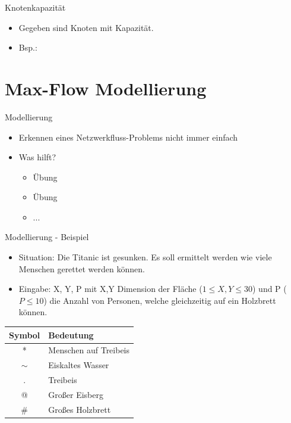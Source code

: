 \documentclass[18pt]{beamer}
\begin{document}
\begin{frame}{Knotenkapazit\"at}
\begin{itemize}
\item Gegeben sind Knoten mit Kapazit\"at.
\item Bsp.:
\end{itemize}
\begin{center}
\end{center}
\end{frame}

\section{Max-Flow Modellierung}
\begin{frame}{Modellierung}
\begin{itemize}
\item Erkennen eines Netzwerkfluss-Problems nicht immer einfach
\pause
\item Was hilft?
\begin{itemize}
\pause
\item \"Ubung
\item \"Ubung
\item ...
\end{itemize}
\end{itemize}
\end{frame}

\begin{frame}{Modellierung - Beispiel}
\begin{itemize}
\item Situation: Die Titanic ist gesunken. Es soll ermittelt werden wie viele Menschen gerettet werden k\"onnen.
\item Eingabe: X, Y, P mit X,Y Dimension der Fl\"ache (\(1 \leq X,Y \leq 30\)) und P (\(P \leq 10\)) die Anzahl von Personen, welche gleichzeitig auf ein Holzbrett k\"onnen.
\end{itemize}
\begin{center}
\begin{tabular}{c|l}
Symbol & Bedeutung \\
\hline
* & Menschen auf Treibeis \\
\(\sim\) & Eiskaltes Wasser \\
. & Treibeis \\
@ & Gro\ss er Eisberg \\
\# & Gro\ss es Holzbrett \\
\end{tabular}
\end{center}
\end{frame}
\end{document}
